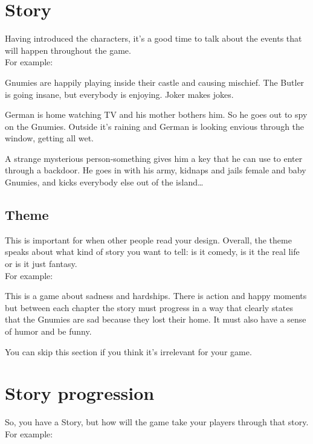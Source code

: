 \documentclass[12pt, a4paper]{article}
\begin{document}
\section{Story}
Having introduced the characters, it’s a good time to talk about the events that will happen throughout the game.\\

For example:

\begin{tcolorbox}
Gnumies are happily playing inside their castle and causing 
mischief. The Butler is going insane, but everybody is enjoying. 
Joker makes jokes.

German is home watching TV and his mother bothers him. So he 
goes out to spy on the Gnumies. Outside it's raining and German 
is looking envious through the window, getting all wet. 

A strange mysterious person-something gives him a key that he 
can use to enter through a backdoor. He goes in with his army, 
kidnaps and jails female and baby Gnumies, and kicks everybody 
else out of the island…
\end{tcolorbox}

\subsection{Theme}
This is important for when other people read your design. Overall, the theme speaks about what kind of story you want to tell: is it comedy, is it the real life or is it just fantasy.\\

For example:

\begin{tcolorbox}
This is a game about sadness and hardships. There is action and happy moments but between each chapter the story must progress in a way that clearly states that the Gnumies are sad because they lost their home. It must also have a sense of humor and be funny.
\end{tcolorbox}

You can skip this section if you think it’s irrelevant for your game.

\section{Story progression}
So, you have a Story, but how will the game take your players through that story.\\

For example:
\end{document}

